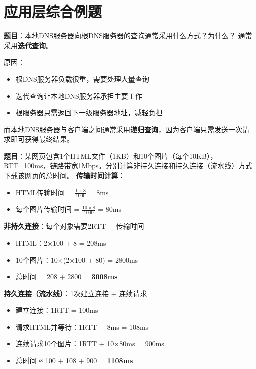 \section{应用层综合例题}

\begin{examplebox}[例题6.5 DNS查询类型]
\textbf{题目}：本地DNS服务器向根DNS服务器的查询通常采用什么方式？为什么？
\tcblower
通常采用\textbf{迭代查询}。

原因：
\begin{itemize}[itemsep=0pt]
    \item 根DNS服务器负载很重，需要处理大量查询
    \item 迭代查询让本地DNS服务器承担主要工作
    \item 根服务器只需返回下一级服务器地址，减轻负担
\end{itemize}

而本地DNS服务器与客户端之间通常采用\textbf{递归查询}，因为客户端只需发送一次请求即可获得最终结果。
\end{examplebox}

\begin{examplebox}[例题6.6 HTTP持久连接]
\textbf{题目}：某网页包含1个HTML文件（1KB）和10个图片（每个10KB），RTT=100ms，链路带宽1Mbps。分别计算非持久连接和持久连接（流水线）方式下载该网页的总时间。
\tcblower
\textbf{传输时间计算}：
\begin{itemize}[itemsep=0pt]
    \item HTML传输时间 = $\frac{1\times8}{1000}$ = 8ms
    \item 每个图片传输时间 = $\frac{10\times8}{1000}$ = 80ms
\end{itemize}

\textbf{非持久连接}：每个对象需要2RTT + 传输时间
\begin{itemize}[itemsep=0pt]
    \item HTML：2×100 + 8 = 208ms
    \item 10个图片：10×(2×100 + 80) = 2800ms
    \item 总时间 = 208 + 2800 = \textbf{3008ms}
\end{itemize}

\textbf{持久连接（流水线）}：1次建立连接 + 连续请求
\begin{itemize}[itemsep=0pt]
    \item 建立连接：1RTT = 100ms
    \item 请求HTML并等待：1RTT + 8ms = 108ms
    \item 连续请求10个图片：1RTT + 10×80ms = 900ms
    \item 总时间 ≈ 100 + 108 + 900 = \textbf{1108ms}
\end{itemize}
\end{examplebox}

